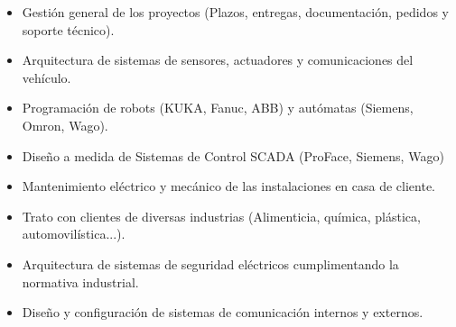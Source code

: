 \documentclass[10pt,a4paper,ragged2e]{altacv}
\begin{document}
    \begin{itemize}
      \item Gestión general de los proyectos (Plazos, entregas, documentación, pedidos y soporte técnico).
      \item Arquitectura de sistemas de sensores, actuadores y comunicaciones del vehículo.
      \item Programación de robots (KUKA, Fanuc, ABB) y autómatas (Siemens, Omron, Wago).
      \item Diseño a medida de Sistemas de Control SCADA (ProFace, Siemens, Wago)
      \item Mantenimiento eléctrico y mecánico de las instalaciones en casa de cliente.
      \item Trato con clientes de diversas industrias (Alimenticia, química, plástica, automovilística...). 
      \item Arquitectura de sistemas de seguridad eléctricos cumplimentando la normativa industrial.
      \item Diseño y configuración de sistemas de comunicación internos y externos.
    \end{itemize}
    \begin{center}
      \vspace*{-0.2cm}
      \\
      \vspace*{-0.2cm}
    \end{center}
\end{document}
